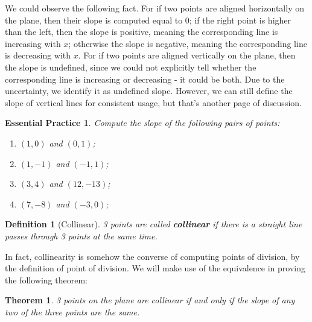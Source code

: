 \documentclass[12pt]{article}
\newtheorem{definition}{Definition}[section]
\newtheorem*{theorem}{Theorem}
\newtheorem{exercise}{Essential Practice}[subsection]
\begin{document}
    We could observe the following fact. For if two points are aligned horizontally on the plane, then their slope is computed equal to 0; if the right point is higher than the left, then the slope is positive, meaning the corresponding line is increasing with $x$; otherwise the slope is negative, meaning the corresponding line is decreasing with $x$. For if two points are aligned vertically on the plane, then the slope is undefined, since we could not explicitly tell whether the corresponding line is increasing or decreasing - it could be both. Due to the uncertainty, we identify it as undefined slope. However, we can still define the slope of vertical lines for consistent usage, but that's another page of discussion.

    \begin{exercise}
        Compute the slope of the following pairs of points:\begin{enumerate}
            \item $(1,0)$ and $(0,1)$;
            \item $(1,-1)$ and $(-1,1)$;
            \item $(3,4)$ and $(12,-13)$;
            \item $(7,-8)$ and $(-3,0)$;
        \end{enumerate}
    \end{exercise}

    \begin{definition}[Collinear]
        3 points are called \textbf{collinear} if there is a straight line passes through 3 points at the same time.
    \end{definition}

    In fact, collinearity is somehow the converse of computing points of division, by the definition of point of division. We will make use of the equivalence in proving the following theorem:

    \begin{theorem}
        3 points on the plane are collinear if and only if the slope of any two of the three points are the same.
    \end{theorem}
\end{document}
